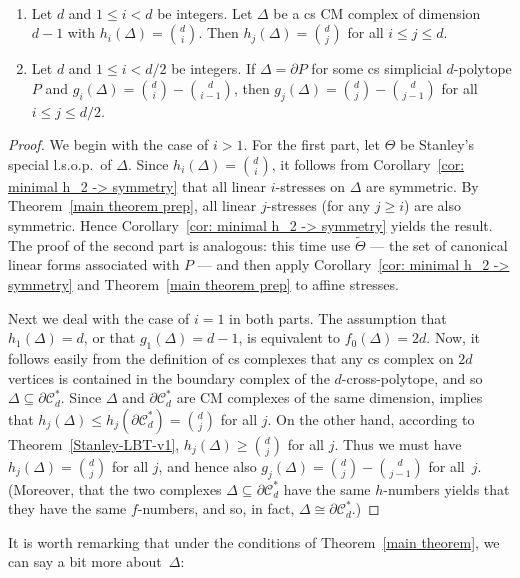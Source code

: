 \documentclass[ALCO,ThmDefs,Unicode,epreuves]{cedram}
\def\C{\mathcal{C}}
\begin{document}
\begin{theorem}\label{main theorem} \ \samepage
\begin{enumerate}
\item 
Let $d$ and $1\leq i<d$ be integers. Let $\Delta$ be a cs CM complex of dimension $d-1$ with $h_i(\Delta)=\binom{d}{i}$. Then $h_j(\Delta)=\binom{d}{j}$ for all $i\leq j\leq d$. 
\item Let $d$ and $1\leq i<d/2$ be integers. If $\Delta=\partial P$ for some cs simplicial $d$-polytope $P$ and $g_i(\Delta)=\binom{d}{i}-\binom{d}{i-1}$, then $g_j(\Delta)=\binom{d}{j}-\binom{d}{j-1}$ for all $i\leq j\leq d/2$. 
\end{enumerate}
\end{theorem}
\begin{proof}
	We begin with the case of $i>1$. For the first part, let $\Theta$ be Stanley's special l.s.o.p.~of $\Delta$. Since $h_i(\Delta)=\binom{d}{i}$, it follows from Corollary~\ref{cor: minimal h_2 -> symmetry} that all linear $i$-stresses on $\Delta$ are symmetric. By Theorem~\ref{main theorem prep}, all linear $j$-stresses (for any $j\geq i$) are also symmetric. Hence Corollary~\ref{cor: minimal h_2 -> symmetry} yields the result. The proof of the second part is analogous: this time use $\widetilde{\Theta}$ --- the set of canonical linear forms associated with $P$ --- and then apply Corollary~\ref{cor: minimal h_2 -> symmetry} and Theorem~\ref{main theorem prep} to affine stresses.
	
	Next we deal with the case of $i=1$ in both parts. The assumption that $h_1(\Delta)=d$, or that $g_1(\Delta)=d-1$, is equivalent to $f_0(\Delta)=2d$. Now, it follows easily from the definition of cs complexes that any cs complex on $2d$ vertices is contained in the boundary complex of the $d$-cross-polytope, and so $\Delta\subseteq \partial \C^*_d$. Since $\Delta$ and $\partial \C^*_d$ are CM complexes of the same dimension, \cite[Theorem 2.1]{Stanley-93} implies that $h_j(\Delta)\leq h_j(\partial \C^*_d)=\binom{d}{j}$ for all $j$. On the other hand, according to Theorem~\ref{Stanley-LBT-v1}, $h_j(\Delta)\geq \binom{d}{j}$ for all $j$. Thus we must have $h_j(\Delta)=\binom{d}{j}$ for all $j$, and hence also $g_j(\Delta)=\binom{d}{j}-\binom{d}{j-1}$ for all~$j$. (Moreover, that the two complexes $\Delta\subseteq \partial\C^*_d$ have the same $h$-numbers yields that they have the same $f$-numbers, and so, in fact, $\Delta\cong\partial\C^*_d$.)
\end{proof}

It is worth remarking that under the conditions of Theorem~\ref{main theorem}, we can say a bit more about~$\Delta$:
\end{document}
